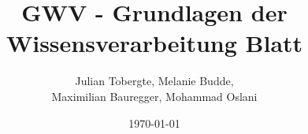 \documentclass[DIV=12,numbers=noenddot]{scrartcl}
\title{GWV - Grundlagen der Wissensverarbeitung Blatt \arabic{blatt}}
\author{Julian Tobergte, Melanie Budde,\\Maximilian Bauregger, Mohammad Oslani}
\date{\today}
\begin{document}
	\maketitle
	\section{}
	\subsection{}
	\subsubsection{}
\end{document}
